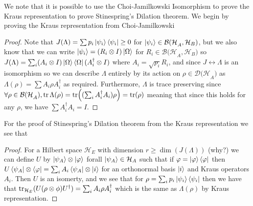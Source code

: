 \documentclass{article}
\theoremstyle{definition}
\begin{document}
We note that it is possible to use the Choi-Jamilkowski Isomorphism to prove
the Kraus representation to prove Stinespring's Dilation theorem. We begin by
proving the Kraus representation from Choi-Jamilkowski
\begin{proof}
\item Note that $J(\Lambda) = \sum p_i \ket{\psi_i} \bra{\psi_i} \geq 0$ for
  $\ket{\psi_i} \in \mathcal{B(H}_A, \mathcal{H}_B)$, but we also know that we
  can write $\ket{\psi_i} = (R_i \otimes I) \ket\Omega$ for $R_i \in 
  \mathcal{B(H}_A, \mathcal H_B)$ so $J(\Lambda) = \sum_i (A_i \otimes I) \ket
  \Omega \bra\Omega (A_i^\dagger \otimes I)$ where $A_i = \sqrt{p_i} R_i$, and
  since $J \leftrightarrow \Lambda$ is an isomorphism so we can describe 
  $\Lambda$ entirely by its action on $\rho \in \mathcal{D(H}_A)$ as $\Lambda
  (\rho) = \sum A_i \rho A_i^\dagger$ as required. Furthermore, $\Lambda$ is
  trace preserving since $\forall \rho \in \mathcal{B(H}_A), \tr \Lambda(\rho)
  = \tr((\sum_i A_i^\dagger A_i) \rho) = \tr(\rho)$ meaning that since this holds
  for any $\rho$, we have $\sum A_i^\dagger A_i = I$. 
\end{proof}

For the proof of Stinespring's Dilation theorem from the Kraus representation
we see that
\begin{proof}
  For a Hilbert space $\mathcal H_E$ with dimension $r \geq \dim(J(\Lambda))$ 
  (why?) we can define $U$ by $\ket{\psi_A} \otimes \ket \varphi$ forall 
  $\ket{\psi_A} \in \mathcal H_A$ such that if $\varphi = \ket \varphi \bra
  \varphi$ then $U \bra{\psi_A} \otimes \bra \varphi = \sum_i A_i \bra{\psi_A}
  \otimes \ket i$ for an orthonormal basis $\ket i$ and Kraus operators $A_i$. 
  Then $U$ is an isomerty, and we see that for $\rho = \sum_i p_i \ket{\psi_i}
  \bra{\psi_i}$ then we have that $\tr_{\mathcal H_E}(U(\rho \otimes \phi) 
  U^\dagger) = \sum_i A_i \rho A_i^\dagger$ which is the same as $\Lambda(
  \rho)$ by Kraus representation.
\end{proof}
\end{document}
